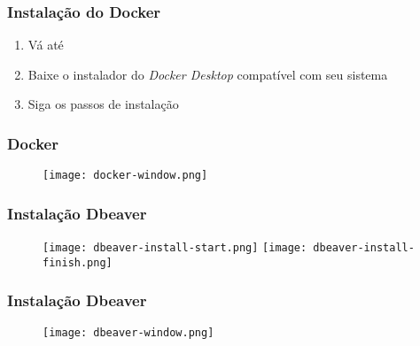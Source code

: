 \documentclass[t, 10pt, aspectratio=169, table, x11names]{beamer}
\begin{document}
	\begin{frame}
		\frametitle{Instalação do Docker}
		\begin{enumerate}
			\item Vá até \href{https://www.docker.com/products/docker-desktop/}{}
			\item Baixe o instalador do \textit{Docker Desktop} compatível com seu sistema
			\item Siga os passos de instalação
		\end{enumerate}
		\begin{figure}[h]
			\hspace{0.5cm}
		\end{figure}
	\end{frame}
	
	\begin{frame}
		\frametitle{Docker}
		\vspace{0.5cm}
		\begin{figure}[h]
			\texttt{[image: docker-window.png]}
		\end{figure}
	\end{frame}
	
	\begin{frame}
		\frametitle{Instalação Dbeaver}
		\vspace{0.5cm}
		\begin{figure}[h]
			\texttt{[image: dbeaver-install-start.png]}
			\hspace{0.5cm}
			\texttt{[image: dbeaver-install-finish.png]}
		\end{figure}
	\end{frame}
	
	\begin{frame}
		\frametitle{Instalação Dbeaver}
		\vspace{0.5cm}
		\begin{figure}[h]
			\texttt{[image: dbeaver-window.png]}
		\end{figure}
	\end{frame}
	
\end{document}
